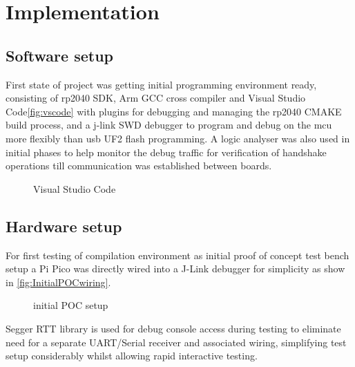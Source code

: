 \clearpage%
\vspace{21.5pt}
\chapter{Implementation}
\section{Software  setup}

First state of project was getting initial programming environment ready, consisting of rp2040 SDK, Arm GCC cross compiler and Visual Studio Code\autoref{fig:vscode} with plugins for debugging and managing the rp2040 CMAKE build process, and a j-link SWD debugger to program and debug on the \gls{mcu} more flexibly than \gls{usb} UF2 flash programming. A logic analyser was also used in initial phases to help monitor the debug traffic for verification of handshake operations till communication was established between boards.

\begin{figure}[ht]
	\centering
	\caption{Visual Studio Code}
	\label{fig:vscode}
\end{figure}

\clearpage
\section{Hardware setup}
%

For first testing of compilation environment as initial proof of concept test bench setup a Pi Pico was directly wired into a J-Link debugger for simplicity as show in \autoref{fig:InitialPOCwiring}.

\begin{figure}[ht]
	\centering
	\caption{initial POC setup}
	\label{fig:InitialPOCwiring}
\end{figure}

Segger RTT library\cite{JLinkRTTReal} is used for debug console access during testing to eliminate need for a separate UART/Serial receiver and associated wiring, simplifying test setup considerably whilst allowing rapid interactive testing. 

